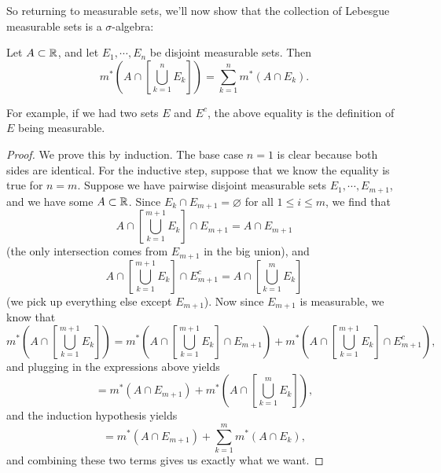 So returning to measurable sets, we'll now show that the collection of Lebesgue measurable sets is a $\sigma$-algebra:

\begin{proposition}\label{disjmeasprop}
Let $A \subset \mathbb R$, and let $E_1, \cdots, E_n$ be disjoint measurable sets. Then 
\[
    m^\ast\left(A \cap \left[\bigcup_{k=1}^n E_k\right]\right) = \sum_{k=1}^n m^\ast(A \cap E_k).
\]
\end{proposition}

For example, if we had two sets $E$ and $E^c$, the above equality is the definition of $E$ being measurable.

\begin{proof}
We prove this by induction. The base case $n = 1$ is clear because both sides are identical. For the inductive step, suppose that we know the equality is true for $n = m$. Suppose we have pairwise disjoint measurable sets $E_1, \cdots, E_{m+1}$, and we have some $A \subset \mathbb R$. Since $E_k \cap E_{m+1} = \varnothing$ for all $1 \le i \le m$, we find that 
\[
    A \cap \left[\bigcup_{k=1}^{m+1} E_k\right] \cap E_{m+1} = A \cap E_{m+1}
\]
(the only intersection comes from $E_{m+1}$ in the big union), and 
\[
    A \cap \left[\bigcup_{k=1}^{m+1} E_k\right] \cap E_{m+1}^c = A \cap \left[\bigcup_{k=1}^{m} E_k\right]
\]
(we pick up everything else except $E_{m+1}$). Now since $E_{m+1}$ is measurable, we know that
\[
    m^\ast\left(A \cap \left[\bigcup_{k=1}^{m+1} E_k\right]\right) = m^\ast\left(A \cap \left[\bigcup_{k=1}^{m+1} E_k\right] \cap E_{m+1}\right) + m^\ast\left(A \cap \left[\bigcup_{k=1}^{m+1} E_k\right] \cap E_{m+1}^c\right),
\]
and plugging in the expressions above yields 
\[
    = m^\ast(A \cap E_{m+1}) + m^\ast\left(A \cap \left[\bigcup_{k=1}^{m} E_k\right]\right),
\]
and the induction hypothesis yields 
\[
    = m^\ast(A \cap E_{m+1}) + \sum_{k=1}^m m^\ast(A \cap E_k),
\]
and combining these two terms gives us exactly what we want. 
\end{proof}

